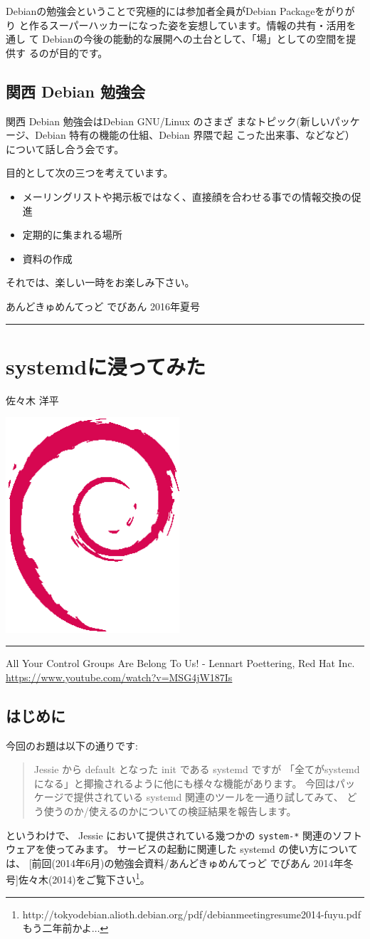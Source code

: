 \documentclass[mingoth,a4paper]{jsarticle}
\renewcommand{\dancersection}[2]{%
\newpage
あんどきゅめんてっど でびあん 2016年夏号
%
\vspace{0.1mm}\\
{\color{dancerdarkblue}\rule{\hsize}{2mm}}

%
%
\begin{minipage}[t]{0.6\hsize}
\color{dancerdarkblue}
\vspace{1cm}
\section{#1}
\hfill{}#2\\
\end{minipage}
\begin{minipage}[t]{0.4\hsize}
\vspace{-2cm}
\hfill{}\includegraphics[height=8cm]{image200502/openlogo-nd.eps}\\
\vspace{-5cm}
\end{minipage}
%
{\color{dancerlightblue}\rule{0.66\hsize}{2mm}}
%
\vspace{2cm}
}
\begin{document}
 Debianの勉強会ということで究極的には参加者全員がDebian Packageをがりがり
 と作るスーパーハッカーになった姿を妄想しています。情報の共有・活用を通し
 て Debianの今後の能動的な展開への土台として、「場」としての空間を提供す
 るのが目的です。

\subsection{関西 Debian 勉強会}

 関西 Debian 勉強会はDebian GNU/Linux のさまざ
 まなトピック(新しいパッケージ、Debian 特有の機能の仕組、Debian 界隈で起
 こった出来事、などなど）について話し合う会です。

 目的として次の三つを考えています。
 \begin{itemize}
  \item メーリングリストや掲示板ではなく、直接顔を合わせる事での情報交換の促進
  \item 定期的に集まれる場所
  \item 資料の作成
 \end{itemize}

 それでは、楽しい一時をお楽しみ下さい。


\clearpage
\newpage
\dancersection{systemdに浸ってみた}{佐々木 洋平}

\begin{flushright}
  All Your Control Groups Are Belong To Us! - Lennart Poettering, Red Hat Inc. \\
  \url{https://www.youtube.com/watch?v=MSG4jW187Is}
\end{flushright}

\subsection{はじめに}

今回のお題は以下の通りです:
\begin{quotation}
  Jessie から default となった init である systemd ですが
  「全てがsystemd になる」と揶揄されるように他にも様々な機能があります。
  今回はパッケージで提供されている systemd 関連のツールを一通り試してみて、
  どう使うのか/使えるのかについての検証結果を報告します。
\end{quotation}

というわけで、
Jessie において提供されている幾つかの \verb|system-*| 関連のソフトウェアを使ってみます。
%
サービスの起動に関連した systemd の使い方については、
[前回(2014年6月)の勉強会資料/あんどきゅめんてっど でびあん 2014年冬号]{佐々木(2014)}をご覧下さい\footnote{http://tokyodebian.alioth.debian.org/pdf/debianmeetingresume2014-fuyu.pdf もう二年前かよ$\dots$}。
\end{document}
